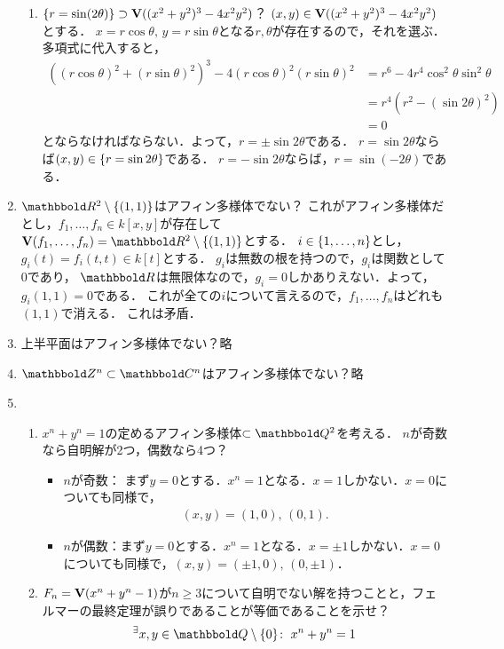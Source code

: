 \documentclass[9pt]{ltjsarticle}
\begin{document}
\begin{enumerate}[label=(問題\arabic*)]
\begin{enumerate}[label=(\alph*)]
 \item $\left\{r=\sin(2\theta)\right\}\supset \textbf V((x^2+y^2)^3-4x^2y^2)$？
$(x,y)\in \textbf V((x^2+y^2)^3-4x^2y^2)$とする．
$x=r\cos \theta,\, y=r\sin\theta$となる$r,\theta$が存在するので，それを選ぶ．
多項式に代入すると，
\begin{align}
 ((r\cos\theta)^2 + (r\sin\theta)^2)^3 - 4(r\cos\theta)^2(r\sin\theta)^2
&=
r^6-4r^4\cos^2\theta \sin^2\theta\\
 & =
r^4(r^2-(\sin 2\theta)^2)\\
 & =0
\end{align}
とならなければならない．よって，$r=\pm \sin 2\theta$である．
$r=\sin2\theta$ならば$(x,y)\in \left\{r=\sin 2\theta\right\}$である．
       $r=-\sin2\theta$ならば，$r=\sin(-2\theta)$である．
\end{enumerate}

 \item $\R^2\setminus\set{(1,1)}$はアフィン多様体でない？
これがアフィン多様体だとし，$f_1,\dots,f_n \in k[x,y]$が存在して
$\var(f_1,\dots,f_n)=\R^2\setminus\set{(1,1)}$とする．
$i\in \left\{1,\dots,n\right\}$とし，$g_i(t)=f_i(t,t) \in k[t]$とする．
$g_i$は無数の根を持つので，$g_i$は関数として0であり，
$\R$は無限体なので，$g_i =0$しかありえない．よって，$g_i(1,1)=0$である．
これが全ての$i$について言えるので，$f_1,\dots,f_n$はどれも$(1,1)$で消える．
これは矛盾．
 \item 上半平面はアフィン多様体でない？略
 \item $\Z^n \subset \C^n$はアフィン多様体でない？略
 \item
\begin{enumerate}[label=(\alph*)]
 \item $x^n+y^n=1$の定めるアフィン多様体$\subset \Q^2$を考える．
$n$が奇数なら自明解が2つ，偶数なら4つ？
\begin{itemize}
 \item $n$が奇数：
まず$y=0$とする．$x^n=1$となる．$x=1$しかない．$x=0$についても同様で，
\begin{align}
 (x,y) = (1,0),\,(0,1).
\end{align}
 \item $n$が偶数：まず$y=0$とする．$x^n=1$となる．$x=\pm 1$しかない．$x=0$についても同様で，$(x,y)=(\pm 1,0),\, (0,\pm 1)$．
\end{itemize}
 \item $F_n=\textbf V(x^n+y^n-1)$が$n\ge 3$について自明でない解を持つことと，フェルマーの最終定理が誤りであることが等価であることを示せ？
\begin{align}
& \Exists{x,y \in \Q\setminus\zeroset} x^n+y^n = 1\\

\end{align}
\end{enumerate}
\end{enumerate}
\end{document}
